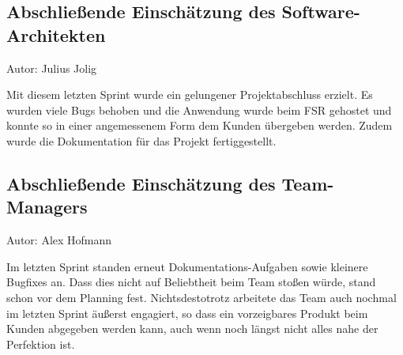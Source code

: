 \subsection{Abschließende Einschätzung des Software-Architekten}
{\small Autor: Julius Jolig}

Mit diesem letzten Sprint wurde ein gelungener Projektabschluss erzielt. Es wurden viele Bugs behoben und die Anwendung wurde beim FSR gehostet und konnte so in einer angemessenem Form dem Kunden übergeben werden. Zudem wurde die Dokumentation für das Projekt fertiggestellt. 

\subsection{Abschließende Einschätzung des Team-Managers}
{\small Autor: Alex Hofmann}

Im letzten Sprint standen erneut Dokumentations-Aufgaben sowie kleinere Bugfixes an. Dass dies nicht auf Beliebtheit beim Team stoßen würde, stand schon vor dem Planning fest. Nichtsdestotrotz arbeitete das Team auch nochmal im letzten Sprint äußerst engagiert, so dass ein vorzeigbares Produkt beim Kunden abgegeben werden kann, auch wenn noch längst nicht alles nahe der Perfektion ist.